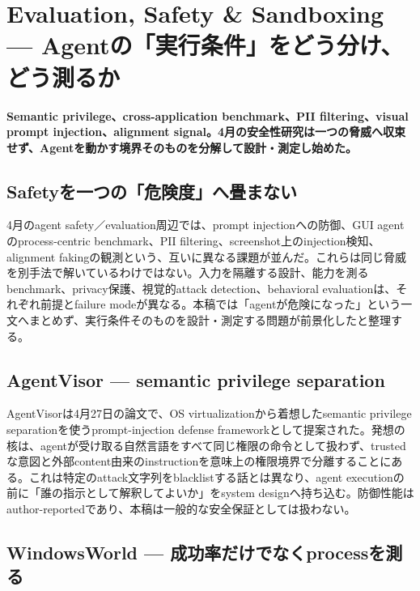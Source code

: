 \section{Evaluation, Safety \& Sandboxing — Agentの「実行条件」をどう分け、どう測るか}
\noindent\textbf{Semantic privilege、cross-application benchmark、PII filtering、visual prompt injection、alignment signal。4月の安全性研究は一つの脅威へ収束せず、Agentを動かす境界そのものを分解して設計・測定し始めた。}\autocite{src-2f8952da2dc3,src-3efc4342b784,src-477d406be59c,src-73ae4b975e7b,src-8cf1b0dc8361,src-a408165af133}

\subsection{Safetyを一つの「危険度」へ畳まない}

4月のagent safety／evaluation周辺では、prompt injectionへの防御、GUI agentのprocess-centric benchmark、PII filtering、screenshot上のinjection検知、alignment fakingの観測という、互いに異なる課題が並んだ。これらは同じ脅威を別手法で解いているわけではない。入力を隔離する設計、能力を測るbenchmark、privacy保護、視覚的attack detection、behavioral evaluationは、それぞれ前提とfailure modeが異なる。本稿では「agentが危険になった」という一文へまとめず、実行条件そのものを設計・測定する問題が前景化したと整理する。\autocite{src-2f8952da2dc3,src-3efc4342b784,src-477d406be59c,src-73ae4b975e7b,src-8cf1b0dc8361,src-a408165af133}


\subsection{AgentVisor — semantic privilege separation}

AgentVisorは4月27日の論文で、OS virtualizationから着想したsemantic privilege separationを使うprompt-injection defense frameworkとして提案された。発想の核は、agentが受け取る自然言語をすべて同じ権限の命令として扱わず、trustedな意図と外部content由来のinstructionを意味上の権限境界で分離することにある。これは特定のattack文字列をblacklistする話とは異なり、agent executionの前に「誰の指示として解釈してよいか」をsystem designへ持ち込む。防御性能はauthor-reportedであり、本稿は一般的な安全保証としては扱わない。\autocite{src-8cf1b0dc8361}


\subsection{WindowsWorld — 成功率だけでなくprocessを測る}

